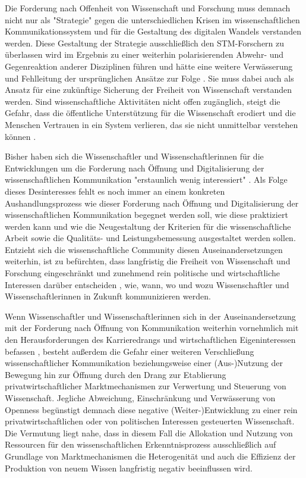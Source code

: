 Die Forderung nach Offenheit von Wissenschaft und Forschung muss demnach nicht nur als "Strategie" gegen die unterschiedlichen Krisen im wissenschaftlichen Kommunikationssystem und für die Gestaltung des digitalen Wandels verstanden werden. Diese Gestaltung der Strategie ausschließlich den STM-Forschern zu überlassen wird im Ergebnis zu einer weiterhin polarisierenden Abwehr- und Gegenreaktion anderer Disziplinen führen und hätte eine weitere Verwässerung und Fehlleitung der ursprünglichen Ansätze zur Folge \cite{Naeder_2010}. Sie muss dabei auch als Ansatz für eine zukünftige Sicherung der Freiheit von Wissenschaft verstanden werden. Sind wissenschaftliche Aktivitäten nicht offen zugänglich, steigt die Gefahr, dass die öffentliche Unterstützung für die Wissenschaft erodiert und die Menschen Vertrauen in ein System verlieren, das sie nicht unmittelbar verstehen können \cite{Resnik_2005}.

Bisher haben sich die Wissenschaftler und Wissenschaftlerinnen für die Entwicklungen um die Forderung nach Öffnung und Digitalisierung der wissenschaftlichen Kommunikation "erstaunlich wenig interessiert" \cite{Hagner_2015}. Als Folge dieses Desinteresses fehlt es noch immer an einem konkreten Aushandlungsprozess wie dieser Forderung nach Öffnung und Digitalisierung der wissenschaftlichen Kommunikation begegnet werden soll, wie diese praktiziert werden kann und wie die Neugestaltung der Kriterien für die wissenschaftliche Arbeit sowie die Qualitäts- und Leistungsbemessung ausgestaltet werden sollen. Entzieht sich die wissenschaftliche Community diesen Auseinandersetzungen weiterhin, ist zu befürchten, dass langfristig die Freiheit von Wissenschaft und Forschung eingeschränkt und zunehmend rein politische und wirtschaftliche Interessen darüber entscheiden \cite{Warnke_2012}, wie, wann, wo und wozu Wissenschaftler und Wissenschaftlerinnen in Zukunft kommunizieren werden.

Wenn Wissenschaftler und Wissenschaftlerinnen sich in der Auseinandersetzung mit der Forderung nach Öffnung von Kommunikation weiterhin vornehmlich mit den Herausforderungen des Karrieredrangs und wirtschaftlichen Eigeninteressen befassen \cite{Resnik_2005}, besteht außerdem die Gefahr einer weiteren Verschließung wissenschaftlicher Kommunikation beziehungsweise einer (Aus-)Nutzung der Bewegung hin zur Öffnung durch den Drang zur Etablierung privatwirtschaftlicher Marktmechanismen zur Verwertung und Steuerung von Wissenschaft. Jegliche Abweichung, Einschränkung und Verwässerung von Openness begünstigt demnach diese negative (Weiter-)Entwicklung zu einer rein privatwirtschaftlichen oder von politischen Interessen gesteuerten Wissenschaft. Die Vermutung liegt nahe, dass in diesem Fall die Allokation und Nutzung von Ressourcen für den wissenschaftlichen Erkenntnisprozess ausschließlich auf Grundlage von Marktmechanismen die Heterogenität und auch die Effizienz der Produktion von neuem Wissen langfristig negativ beeinflussen wird.

